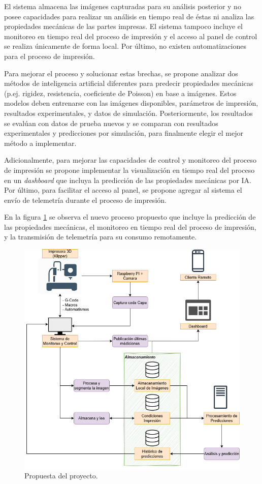 \documentclass[
11pt, %
]{charter}
\begin{document}
El sistema almacena las imágenes capturadas para su análisis posterior y no posee capacidades para realizar un análisis en tiempo real de éstas ni analiza las propiedades mecánicas de las partes impresas. El sistema tampoco incluye el monitoreo en tiempo real del proceso de impresión y el acceso al panel de control se realiza únicamente de forma local. Por último, no existen automatizaciones para el proceso de impresión.

Para mejorar el proceso y solucionar estas brechas, se propone analizar dos métodos de inteligencia artificial diferentes para predecir propiedades mecánicas (p.ej. rigidez, resistencia, coeficiente de Poisson) en base a imágenes. Estos modelos deben entrenarse con las imágenes disponibles, parámetros de impresión, resultados experimentales, y datos de simulación. Posteriormente, los resultados se evalúan con datos de prueba nuevos y se comparan con resultados experimentales y predicciones por simulación, para finalmente elegir el mejor método a implementar.

Adicionalmente, para mejorar las capacidades de control y monitoreo del proceso de impresión se propone implementar la visualización en tiempo real del proceso en un \textit{dashboard} que incluya la predicción de las propiedades mecánicas por IA. Por último, para facilitar el acceso al panel, se propone agregar al sistema el envío de telemetría durante el proceso de impresión.

En la figura \ref{fig:procesoPropuesta} se observa el nuevo proceso propuesto que incluye la predicción de las propiedades mecánicas, el monitoreo en tiempo real del proceso de impresión, y la transmisión de telemetría para su consumo remotamente. 

\begin{figure}[htpb]
\centering 
\includegraphics[width=.8\textwidth]{Figuras/proceso-Propuesto.png}
\caption{Propuesta del proyecto.}
\label{fig:procesoPropuesta}
\end{figure}
\end{document}
